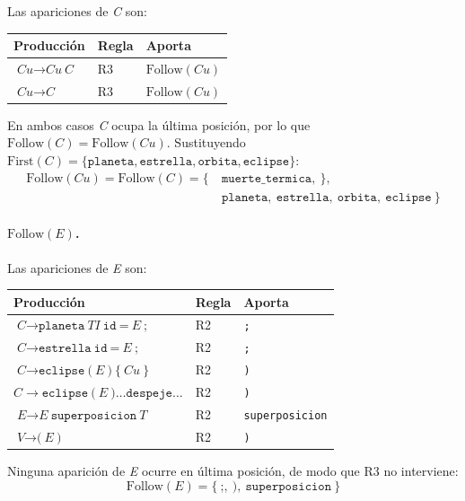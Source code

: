 \documentclass[12pt, letterpaper]{article}
\newcommand{\nt}[1]{\textit{#1}}          %
\newcommand{\tl}[1]{\texttt{#1}}          %
\newcommand{\der}{\ensuremath{\rightarrow}}
\begin{document}
Las apariciones de \nt{C} son:

\begin{center}
\begin{tabular}{l l l}
\toprule
Producción & Regla & Aporta \\
\midrule
$\nt{Cu} \der \nt{Cu}\ \nt{C}$ & R3 & $\mathrm{Follow}(Cu)$ \\
$\nt{Cu} \der \nt{C}$ & R3 & $\mathrm{Follow}(Cu)$ \\
\bottomrule
\end{tabular}
\end{center}

En ambos casos \nt{C} ocupa la última posición, por lo que
$\mathrm{Follow}(C) = \mathrm{Follow}(Cu)$. Sustituyendo
$\mathrm{First}(C) = \{\tl{planeta}, \tl{estrella}, \tl{orbita}, \tl{eclipse}\}$:
\begin{align*}
  \mathrm{Follow}(Cu) = \mathrm{Follow}(C) = \{\ &\tl{muerte\_termica},\ \tl{\}},\\
  &\tl{planeta},\ \tl{estrella},\ \tl{orbita},\ \tl{eclipse}\ \}
\end{align*}



\paragraph{$\mathrm{Follow}(E)$.} Las apariciones de \nt{E} son:

\begin{center}
\begin{tabular}{l l l}
\toprule
Producción & Regla & Aporta \\
\midrule
$\nt{C} \der \tl{planeta}\ \nt{TI}\ \tl{id}\ \tl{=}\ \nt{E}\ \tl{;}$ & R2 & \tl{;} \\
$\nt{C} \der \tl{estrella}\ \tl{id}\ \tl{=}\ \nt{E}\ \tl{;}$ & R2 & \tl{;} \\
$\nt{C} \der \tl{eclipse}\ \tl{(}\ \nt{E}\ \tl{)}\ \tl{\{}\ \nt{Cu}\ \tl{\}}$ & R2 & \tl{)} \\
$\nt{C} \der \tl{eclipse}\ \tl{(}\ \nt{E}\ \tl{)} \ldots \tl{despeje} \ldots$ & R2 & \tl{)} \\
$\nt{E} \der \nt{E}\ \tl{superposicion}\ \nt{T}$ & R2 & \tl{superposicion} \\
$\nt{V} \der \tl{(}\ \nt{E}\ \tl{)}$ & R2 & \tl{)} \\
\bottomrule
\end{tabular}
\end{center}

Ninguna aparición de \nt{E} ocurre en última posición, de modo que R3 no
interviene:
\[
  \mathrm{Follow}(E) = \{\ \tl{;},\ \tl{)},\ \tl{superposicion}\ \}
\]
\end{document}
